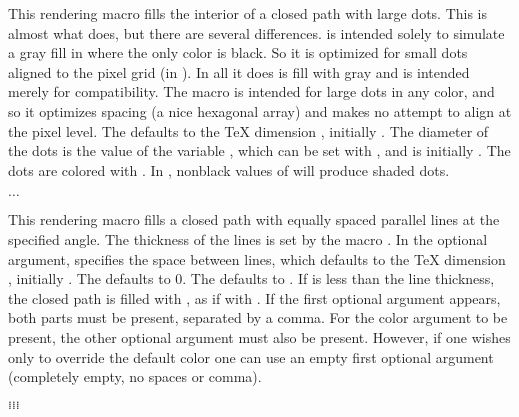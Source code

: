 \documentclass[letterpaper]{article}
\begin{document}
This rendering macro fills the interior of a closed path with large
dots. This is almost what  does, but there are several
differences.  is intended solely to simulate a gray fill in
\MF{} where the only color is black. So it is optimized for small dots
aligned to the pixel grid (in \MF{}). In \MP{} all it does is fill with
gray and is intended merely for compatibility. The macro 
is intended for large dots in any color, and so it optimizes spacing (a
nice hexagonal array) and makes no attempt to align at the pixel level.
The  defaults to the \TeX{} dimension ,
initially \dim{10pt}. The diameter of the dots is the value of the \MF{}
variable , which can be set with
, and is initially \dim{5bp}. The dots
are colored with . In
\MF{}, nonblack values of  will produce shaded dots.

\begin{cd}
$\ldots$%
\end{cd}

This rendering macro fills a closed path with equally spaced parallel
lines at the specified angle. The thickness of the lines is set by the
macro . In the optional argument,  specifies
the space between lines, which defaults to the \TeX{} dimension
, initially \dim{3pt}. The  defaults to 0.
The  defaults to . If  is
less than the line thickness, the closed path is filled with
, as if with . If the first optional argument
appears, both parts must be present, separated by a comma. For the color
argument to be present, the other optional argument must also be
present. However, if one wishes only to override the default color one
can use an empty first optional argument (completely empty, no spaces or
comma).

\begin{cd}
$\ldots$\\
$\ldots$\\
$\ldots$\\
$\ldots$%
%
%
%
%
\end{cd}
\end{document}

